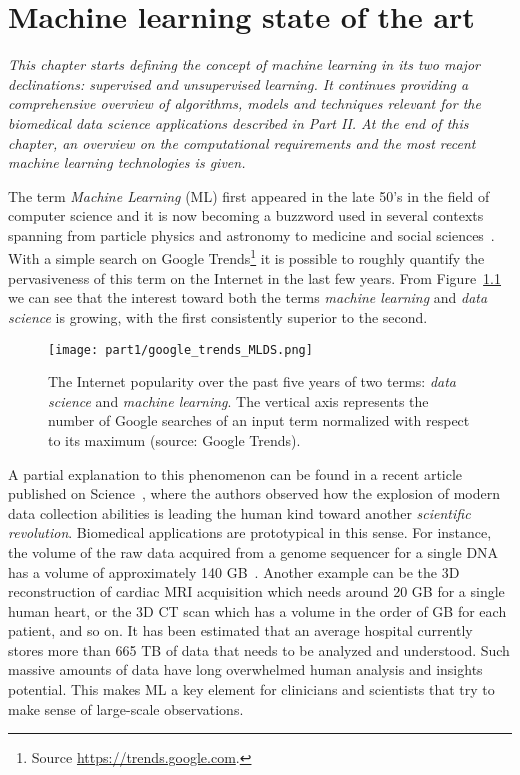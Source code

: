 
\chapter{Machine learning state of the art} \label{chap:state-of-the-art}

\begin{displayquote}
	\textit{This chapter starts defining the concept of machine learning in its two major declinations: supervised and unsupervised learning. It continues providing a comprehensive overview  of algorithms, models and techniques relevant for the biomedical data science applications described in Part II. At the end of this chapter, an overview on the computational requirements and the most recent machine learning technologies is given.}
\end{displayquote}

The term \textit{Machine Learning} (ML) first appeared in the late 50's in the field of computer science and it is now becoming a buzzword used in several contexts spanning from particle physics and astronomy to medicine and social sciences~\cite{service2017ai}.
With a simple search on Google Trends\footnote{Source \url{https://trends.google.com}.} it is possible to roughly quantify the pervasiveness of this term on the Internet in the last few years. From Figure~\ref{fig:google_trend_ML} we can see that the interest toward both the terms \textit{machine learning} and \textit{data science} is growing, with the first consistently superior to the second.

\begin{figure}[h!]
  \centering
    \texttt{[image: part1/google\_trends\_MLDS.png]}
  \caption{The Internet popularity over the past five years of two terms: \textit{data science} and \textit{machine learning}. The vertical axis represents the number of Google searches of an input term normalized with respect to its maximum (source: Google Trends).} \label{fig:google_trend_ML}
\end{figure}

A partial explanation to this phenomenon can be found in a recent article published on Science~\cite{appenzeller2017revolution}, where the authors observed how the explosion of modern data collection abilities is leading the human kind toward another \textit{scientific revolution}.
Biomedical applications are prototypical in this sense. For instance, the volume of the raw data acquired from a genome sequencer for a single \ac{DNA} has a volume of approximately 140 GB~\cite{marx2013biology}. Another example can be the 3D reconstruction of cardiac MRI acquisition which needs around 20 GB for a single human heart, or the 3D \ac{CT} scan which has a volume in the order of GB for each patient, and so on. It has been estimated that an average hospital currently stores more than 665 TB of data that needs to be analyzed and understood.
Such massive amounts of data have long overwhelmed human analysis and insights potential. This makes ML a key element for clinicians and scientists that try to make sense of large-scale observations.

